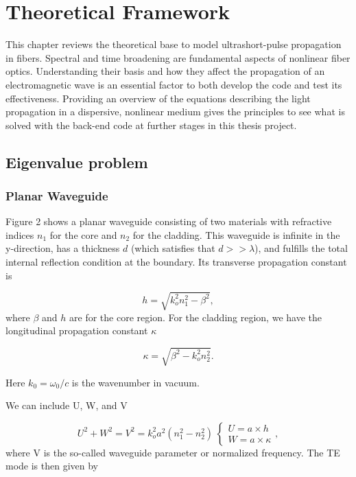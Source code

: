 \chapter{Theoretical Framework}

This chapter reviews the theoretical base to model ultrashort-pulse propagation in fibers. Spectral and time broadening are fundamental aspects of nonlinear fiber optics. Understanding their basis and how they affect the propagation of an electromagnetic wave is an essential factor to both develop the code and test its effectiveness. Providing an overview of the equations describing the light propagation in a dispersive, nonlinear medium gives the principles to see what is solved with the back-end code at further stages in this thesis project.

\section{Eigenvalue problem}

\subsection{Planar Waveguide}
  
Figure 2 shows a planar waveguide consisting of two materials with refractive indices $n_1$ for the core and $n_2$ for the cladding. This waveguide is infinite in the y-direction, has a thickness $d$ (which satisfies that $d >> \lambda$), and fulfills the total internal reflection condition at the boundary.  Its transverse propagation constant is 

            \begin{equation}
                h=\sqrt{k_o^2n_1^2-\beta^2},
                \label{eq_h}
            \end{equation}
 where $\beta$ and $h$ are for the core region. For the cladding region, we have the longitudinal propagation constant $\kappa$

             \begin{equation}
                \kappa=\sqrt{\beta^2-k_o^2n_2^2}.
                \label{gam}
            \end{equation}
 
 Here $k_0 = \omega_0/c$ is the wavenumber in vacuum.

We can include U, W, and V

            \begin{equation}
                U^2+W^2 = V^2 = k_o^2a^2(n_1^2-n_2^2) \
                \begin{cases}
                    U = a \times h \\
                    W = a \times \kappa
                \end{cases} 
                \label{Normv},
            \end{equation}
where V is the so-called waveguide parameter or normalized frequency. 
The TE mode is then given by 
         
